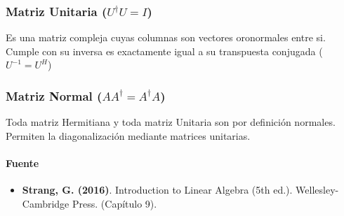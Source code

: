 \documentclass[11pt]{article}
\providecommand{\tightlist}{%
      \setlength{\itemsep}{0pt}\setlength{\parskip}{0pt}}
\begin{document}
\subsubsection{\texorpdfstring{Matriz Unitaria
(\(U^\dagger U = I\))}{Matriz Unitaria (U\^{}\textbackslash dagger U = I)}}\label{matriz-unitaria-udagger-u-i}

Es una matriz compleja cuyas columnas son vectores oronormales entre si.
Cumple con su inversa es exactamente igual a su transpuesta conjugada
(\(U^{-1} = U^H\))

\subsubsection{\texorpdfstring{Matriz Normal
(\(AA^\dagger = A^\dagger A\))}{Matriz Normal (AA\^{}\textbackslash dagger = A\^{}\textbackslash dagger A)}}\label{matriz-normal-aadagger-adagger-a}

Toda matriz Hermitiana y toda matriz Unitaria son por definición
normales. Permiten la diagonalización mediante matrices unitarias.

\paragraph{Fuente}\label{fuente}

\begin{itemize}
\tightlist
\item
  \textbf{Strang, G. (2016)}. Introduction to Linear Algebra (5th ed.).
  Wellesley-Cambridge Press. (Capítulo 9).
\end{itemize}
\end{document}
